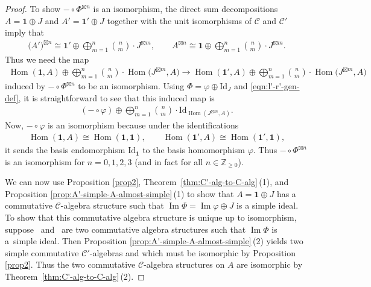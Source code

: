 \documentclass[pdftex]{sigma}
\numberwithin{equation}{section}
\theoremstyle{definition}
\begin{document}
\begin{proof}
To show $-\circ\Phi^{\boxtimes n}$ is an isomorphism, the direct sum decompositions $A=\mathbf{1}\oplus J$ and $A'=\mathbf{1}'\oplus J$ together with the unit isomorphisms of $\mathcal{C}$ and $\mathcal{C}'$ imply that
\begin{gather*}
\bigl(A'\bigr)^{\boxtimes n} \cong \mathbf{1}'\oplus\bigoplus_{m=1}^n \binom{n}{m}\cdot J^{\boxtimes m},\qquad A^{\boxtimes n}\cong\mathbf{1}\oplus\bigoplus_{m=1}^n \binom{n}{m}\cdot J^{\boxtimes m}.
\end{gather*}
Thus we need the map
\begin{gather*}
\operatorname{Hom}(\mathbf{1},A)\oplus\bigoplus_{m=1}^n \binom{n}{m}\cdot\operatorname{Hom}\bigl(J^{\boxtimes m}, A\bigr)\longrightarrow\operatorname{Hom}(\mathbf{1}',A)\oplus\bigoplus_{m=1}^n \binom{n}{m}\cdot\operatorname{Hom}\bigl(J^{\boxtimes m}, A\bigr)
\end{gather*}
induced by $-\circ\Phi^{\boxtimes n}$ to be an isomorphism. Using $\Phi=\varphi\oplus\mathrm{Id}_J$ and \eqref{eqn:l'-r'-gen-def}, it is straightforward to see that this induced map is
\begin{gather*}
(-\circ\varphi)\oplus\bigoplus_{m=1}^n \binom{n}{m}\cdot\mathrm{Id}_{\operatorname{Hom}(J^{\boxtimes m},A)}.
\end{gather*}
Now, $-\circ\varphi$ is an isomorphism because under the identifications
\begin{gather*}
\operatorname{Hom}(\mathbf{1},A)\cong\operatorname{Hom}(\mathbf{1},\mathbf{1}),\qquad\operatorname{Hom}(\mathbf{1}',A)\cong\operatorname{Hom}(\mathbf{1}',\mathbf{1}),
\end{gather*}
it sends the basis endomorphism $\mathrm{Id}_\mathbf{1}$ to the basis homomorphism $\varphi$. Thus $-\circ\Phi^{\boxtimes n}$ is an isomorphism for $n=0,1,2,3$ (and in fact for all $n\in\mathbb{Z}_{\geq 0}$).

We can now use Proposition \ref{prop2}, Theorem~\ref{thm:C'-alg-to-C-alg}\,(1), and Proposition \ref{prop:A'-simple-A-almost-simple}\,(1) to show that $A=\mathbf{1}\oplus J$ has a commutative $\mathcal{C}$-algebra structure such that $\operatorname{Im} \Phi=\operatorname{Im} \varphi\oplus J$ is a simple ideal. To show that this commutative algebra structure is unique up to isomorphism, suppose~ and~ are two commutative algebra structures such that $\operatorname{Im} \Phi$ is a~simple ideal. Then Proposition \ref{prop:A'-simple-A-almost-simple}\,(2) yields two simple commutative $\mathcal{C}'$-algebras  and  which must be isomorphic by Proposition \ref{prop2}. Thus the two commutative $\mathcal{C}$-algebra structures on $A$ are isomorphic by Theorem~\ref{thm:C'-alg-to-C-alg}\,(2).


\end{proof}
\end{document}
